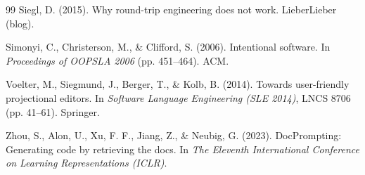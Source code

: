 \documentclass[sigconf,nonacm]{acmart}
\begin{document}
\begin{thebibliography}{99}
Siegl, D. (2015). Why round-trip engineering does not work. LieberLieber (blog).

Simonyi, C., Christerson, M., \& Clifford, S. (2006). Intentional software. In
\textit{Proceedings of OOPSLA 2006} (pp. 451--464). ACM.

Voelter, M., Siegmund, J., Berger, T., \& Kolb, B. (2014). Towards user-friendly
projectional editors. In \textit{Software Language Engineering (SLE 2014)}, LNCS
8706 (pp. 41--61). Springer.

Zhou, S., Alon, U., Xu, F. F., Jiang, Z., \& Neubig, G. (2023). DocPrompting:
Generating code by retrieving the docs. In \textit{The Eleventh International
Conference on Learning Representations (ICLR)}.

\end{thebibliography}
\end{document}
